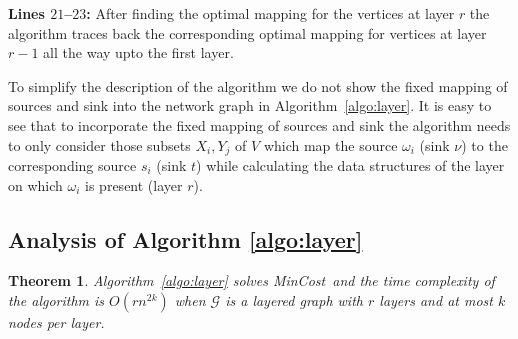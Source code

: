 \documentclass[journal]{IEEEtran}
\newtheorem{theorem}{{\bf Theorem}}
\newcommand{\netnodes}{V}
\newcommand{\compgraph}{\mathcal{G}}
\newcommand{\mincost}{\textsf{MinCost}}
\begin{document}
\textbf{Lines $21$--$23$:} After finding the optimal mapping for the vertices
  at layer $r$ the algorithm traces back the corresponding optimal
  mapping for vertices at layer $r-1$ all the way upto the first
  layer.


To simplify the description of the algorithm we do not show the fixed
mapping of sources and sink into the network graph in
Algorithm~\ref{algo:layer}. It is easy to see that to incorporate the
fixed mapping of sources and sink the algorithm needs to only consider
those subsets $X_i,Y_j$ of $\netnodes$ which map the source $\omega_i$
(sink $\nu$) to the corresponding source $s_i$ (sink $t$) while
calculating the data structures of the layer on which $\omega_i$ is
present (layer $r$).

\subsection{Analysis of Algorithm \ref{algo:layer}}

\begin{theorem}
  \label{thm:mincost_layer}
  Algorithm~\ref{algo:layer} solves \mincost\ and the time complexity
  of the algorithm is $O(rn^{2k})$ when $\compgraph$ is a layered
  graph with $r$ layers and at most $k$ nodes per layer.
\end{theorem}
\end{document}

